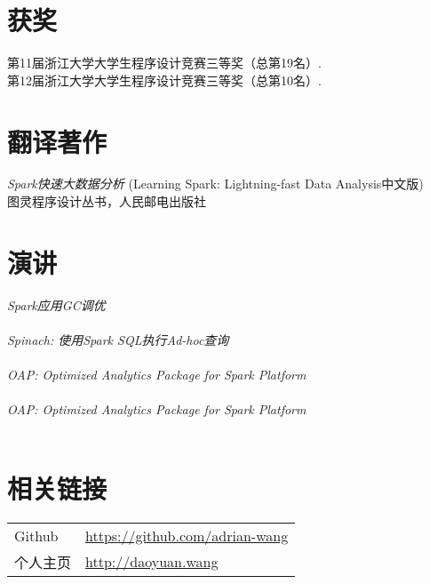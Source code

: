 \documentclass[line,margin]{res}
\begin{document}
\begin{resume}
\section{获奖}
            第11届浙江大学大学生程序设计竞赛三等奖（总第19名）.\\
            第12届浙江大学大学生程序设计竞赛三等奖（总第10名）.

\section{翻译著作}
            {\sl Spark快速大数据分析} (Learning Spark: Lightning-fast Data Analysis中文版) \\
            \hfill 图灵程序设计丛书，人民邮电出版社

\section{演讲}
            {\sl Spark应用GC调优}\\
                \\
            {\sl Spinach: 使用Spark SQL执行Ad-hoc查询}\\
                \\
            {\sl OAP: Optimized Analytics Package for Spark Platform}\\
                \\
            {\sl OAP: Optimized Analytics Package for Spark Platform}\\
                \\

\section{相关链接}
            \begin{tabular}{p{}p{}}
            {Github} &\href{https://github.com/adrian-wang}{https://github.com/adrian-wang}\\
            {个人主页} &\href{http://daoyuan.wang}{http://daoyuan.wang}\\
            \end{tabular}
\end{resume}
\end{document}

